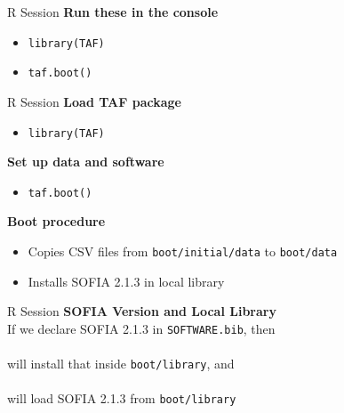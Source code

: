 \documentclass[aspectratio=169]{beamer}
\begin{document}

\begin{frame}[fragile]{R Session}
  \textbf{\darkgreen Run these in the console}\\[0.3ex]
  \begin{itemize}
    \item[] \verb|library(TAF)|\\[1ex]
    \item[] \verb|taf.boot()|\\[1ex]
  \end{itemize}
\end{frame}


\begin{frame}[fragile]{R Session}
  \textbf{\darkgreen Load TAF package}
  \begin{itemize}
    \item[] \verb|library(TAF)|\\[1ex]
  \end{itemize}
  \vspace{3ex}
  \textbf{\darkgreen Set up data and software}
  \begin{itemize}
    \item[] \verb|taf.boot()|\\[1ex]
  \end{itemize}
  \vspace{3ex}
  \textbf{\darkgreen Boot procedure}\\[0.3ex]
  \begin{itemize}
    \item[] Copies CSV files from \verb|boot/initial/data| to
    \verb|boot/data|\\[1.2ex]
    \item[] Installs SOFIA 2.1.3 in local library\\[1ex]
  \end{itemize}
\end{frame}


\begin{frame}{R Session}
  \textbf{\darkgreen SOFIA Version and Local Library}\\[1.5ex]
  If we declare SOFIA 2.1.3 in {\tt SOFTWARE.bib}, then\\[1ex]
  \\[1ex]
  will {\darkgreen install} that inside {\tt boot/library}, and\\[1ex]
  \\[1ex]
  will {\darkgreen load} SOFIA 2.1.3 from {\tt boot/library}
\end{frame}
\end{document}
